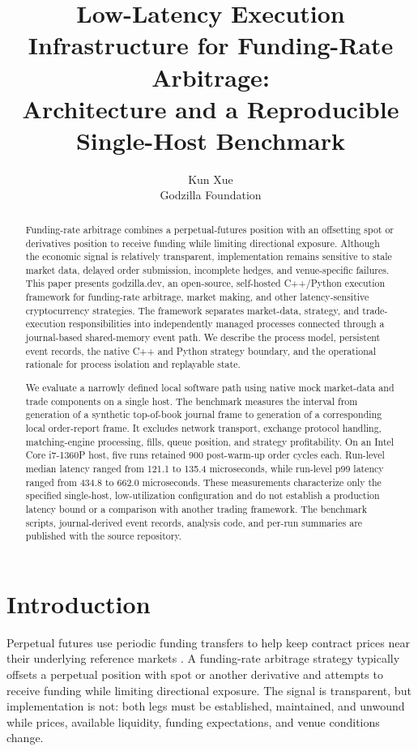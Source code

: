 \documentclass[11pt]{article}
\title{Low-Latency Execution Infrastructure for Funding-Rate Arbitrage:\\
Architecture and a Reproducible Single-Host Benchmark}
\author{Kun Xue\\
\small Godzilla Foundation}
\date{}
\newcommand{\framework}{godzilla.dev}
\begin{document}
\maketitle

\begin{abstract}
Funding-rate arbitrage combines a perpetual-futures position with an offsetting spot or derivatives position to receive funding while limiting directional exposure. Although the economic signal is relatively transparent, implementation remains sensitive to stale market data, delayed order submission, incomplete hedges, and venue-specific failures. This paper presents \framework, an open-source, self-hosted C++/Python execution framework for funding-rate arbitrage, market making, and other latency-sensitive cryptocurrency strategies. The framework separates market-data, strategy, and trade-execution responsibilities into independently managed processes connected through a journal-based shared-memory event path. We describe the process model, persistent event records, the native C++ and Python strategy boundary, and the operational rationale for process isolation and replayable state.

We evaluate a narrowly defined local software path using native mock market-data and trade components on a single host. The benchmark measures the interval from generation of a synthetic top-of-book journal frame to generation of a corresponding local order-report frame. It excludes network transport, exchange protocol handling, matching-engine processing, fills, queue position, and strategy profitability. On an Intel Core i7-1360P host, five runs retained 900 post-warm-up order cycles each. Run-level median latency ranged from 121.1 to 135.4 microseconds, while run-level p99 latency ranged from 434.8 to 662.0 microseconds. These measurements characterize only the specified single-host, low-utilization configuration and do not establish a production latency bound or a comparison with another trading framework. The benchmark scripts, journal-derived event records, analysis code, and per-run summaries are published with the source repository.
\end{abstract}

\section{Introduction}

Perpetual futures use periodic funding transfers to help keep contract prices near their underlying reference markets \cite{he2024perpetual}. A funding-rate arbitrage strategy typically offsets a perpetual position with spot or another derivative and attempts to receive funding while limiting directional exposure. The signal is transparent, but implementation is not: both legs must be established, maintained, and unwound while prices, available liquidity, funding expectations, and venue conditions change.
\end{document}
